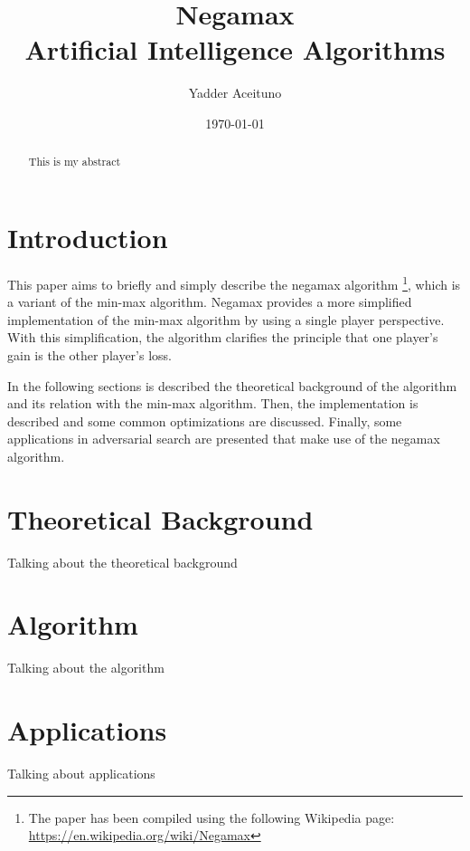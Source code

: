 \documentclass{LSkill}  %
\begin{document}
\title{%
    \Huge\bfseries Negamax \\[0.5em]
    \large\mdseries Artificial Intelligence Algorithms
}
\author{Yadder Aceituno}
\date{\today}

\maketitle 

\begin{abstract}
This is my abstract
\end{abstract}

\tableofcontents

\section{Introduction}
This paper aims to briefly and simply describe the negamax algorithm \footnote{\label{fn:negamax}The paper has been compiled using the following Wikipedia page: \url{https://en.wikipedia.org/wiki/Negamax}}, which is a variant of the min-max algorithm. 
Negamax provides a more simplified implementation of the min-max algorithm by using a single player perspective. 
With this simplification, the algorithm clarifies the principle that one player's gain is the other player's loss.

In the following sections is described the theoretical background of the algorithm and its relation with the min-max algorithm. Then, the implementation is described and some common optimizations are discussed. Finally, some applications in adversarial search are presented that make use of the negamax algorithm. 

\section{Theoretical Background}
Talking about the theoretical background

\section{Algorithm}
Talking about the algorithm

\section{Applications}
Talking about applications

   
   
\end{document}
